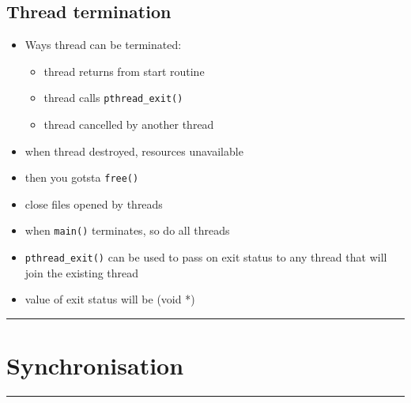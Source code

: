 \documentclass[10pt, multicolumn, a4paper]{article}
\begin{document}
\begin{multicols}{2}
	\subsection*{Thread termination}
	\begin{itemize}
	\item Ways thread can be terminated:
		\begin{itemize}
		\item thread returns from start routine
		\item thread calls \verb|pthread_exit()|
		\item thread cancelled by another thread
		\end{itemize}
	\item when thread destroyed, resources unavailable
	\item then you gotsta \verb|free()|
	\item close files opened by threads
	\item when \verb|main()| terminates, so do all threads
	\item \verb|pthread_exit()| can be used to pass on exit status to any thread that will join the existing thread
	\item value of exit status will be (void *)
	\end{itemize}
\end{multicols}


\hrule
\section{Synchronisation}
\hrule 
\end{document}
